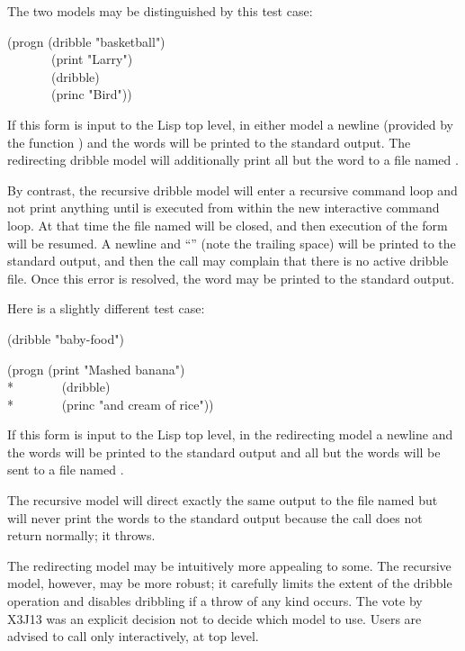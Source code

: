 \begin{defun}[Function]
\begin{new}
The two models may be distinguished by this test case:
\begin{lisp}
(progn (dribble "basketball") \\
~~~~~~~(print "Larry") \\
~~~~~~~(dribble) \\
~~~~~~~(princ "Bird"))
\end{lisp}
If this form is input to the Lisp top level, in either model
a newline (provided by the function ) and the words
 will be printed to the standard output.
The redirecting dribble model will additionally print all but the word
 to a file named .

By contrast, the recursive dribble model will enter a recursive command
loop and not print anything until  is executed from within
the new interactive command loop.  At that time the file named
 will be closed, and then execution of the
 form will be resumed.  A newline and ``'' (note the trailing space)
will be printed to the standard output, and then the call
 may complain that there is no active dribble file.
Once this error is resolved, the word  may be printed
to the standard output.

Here is a slightly different test case:
\begin{lisp}
(dribble "baby-food")
\end{lisp}
\begin{lisp}
(progn (print "Mashed banana") \\*
~~~~~~~(dribble) \\*
~~~~~~~(princ "and cream of rice"))
\end{lisp}
If this form is input to the Lisp top level, in the redirecting model
a newline and the words
 will be printed to the standard output
and all but the words
 will be sent to a file named .

The recursive model will direct exactly the same output to the file
named  but will never print the words
 to the standard output because the call
 does not return normally; it throws.

The redirecting model may be intuitively more appealing to some.
The recursive model, however, may be more robust; it carefully limits
the extent of the dribble operation and disables dribbling if a
throw of any kind occurs.  The vote by X3J13 was an explicit decision
not to decide which model to use.  Users are advised to call 
only interactively, at top level.
\end{new}
\end{defun}



